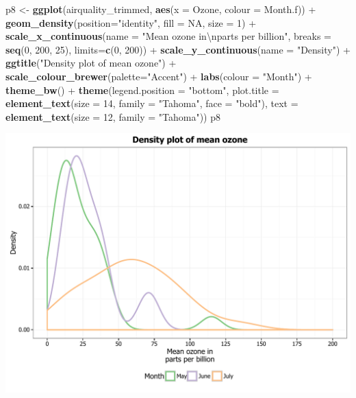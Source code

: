 \documentclass[]{article}
\newenvironment{Shaded}{\begin{snugshade}}{\end{snugshade}}
\newcommand{\KeywordTok}[1]{\textcolor[rgb]{0.13,0.29,0.53}{\textbf{{#1}}}}
\newcommand{\DataTypeTok}[1]{\textcolor[rgb]{0.13,0.29,0.53}{{#1}}}
\newcommand{\DecValTok}[1]{\textcolor[rgb]{0.00,0.00,0.81}{{#1}}}
\newcommand{\CharTok}[1]{\textcolor[rgb]{0.31,0.60,0.02}{{#1}}}
\newcommand{\StringTok}[1]{\textcolor[rgb]{0.31,0.60,0.02}{{#1}}}
\newcommand{\OtherTok}[1]{\textcolor[rgb]{0.56,0.35,0.01}{{#1}}}
\newcommand{\NormalTok}[1]{{#1}}
\begin{document}
\begin{Shaded}
\begin{Highlighting}[]
\NormalTok{p8 <-}\StringTok{ }\KeywordTok{ggplot}\NormalTok{(airquality_trimmed, }\KeywordTok{aes}\NormalTok{(}\DataTypeTok{x =} \NormalTok{Ozone, }\DataTypeTok{colour =} \NormalTok{Month.f)) +}\StringTok{ }
\StringTok{      }\KeywordTok{geom_density}\NormalTok{(}\DataTypeTok{position=}\StringTok{"identity"}\NormalTok{, }\DataTypeTok{fill =} \OtherTok{NA}\NormalTok{, }\DataTypeTok{size =} \DecValTok{1}\NormalTok{) +}
\StringTok{      }\KeywordTok{scale_x_continuous}\NormalTok{(}\DataTypeTok{name =} \StringTok{"Mean ozone in}\CharTok{\textbackslash{}n}\StringTok{parts per billion"}\NormalTok{,}
                         \DataTypeTok{breaks =} \KeywordTok{seq}\NormalTok{(}\DecValTok{0}\NormalTok{, }\DecValTok{200}\NormalTok{, }\DecValTok{25}\NormalTok{),}
                         \DataTypeTok{limits=}\KeywordTok{c}\NormalTok{(}\DecValTok{0}\NormalTok{, }\DecValTok{200}\NormalTok{)) +}
\StringTok{      }\KeywordTok{scale_y_continuous}\NormalTok{(}\DataTypeTok{name =} \StringTok{"Density"}\NormalTok{) +}
\StringTok{      }\KeywordTok{ggtitle}\NormalTok{(}\StringTok{"Density plot of mean ozone"}\NormalTok{) +}
\StringTok{      }\KeywordTok{scale_colour_brewer}\NormalTok{(}\DataTypeTok{palette=}\StringTok{"Accent"}\NormalTok{) +}
\StringTok{      }\KeywordTok{labs}\NormalTok{(}\DataTypeTok{colour =} \StringTok{"Month"}\NormalTok{) +}
\StringTok{      }\KeywordTok{theme_bw}\NormalTok{() +}
\StringTok{      }\KeywordTok{theme}\NormalTok{(}\DataTypeTok{legend.position =} \StringTok{"bottom"}\NormalTok{,}
            \DataTypeTok{plot.title =} \KeywordTok{element_text}\NormalTok{(}\DataTypeTok{size =} \DecValTok{14}\NormalTok{, }\DataTypeTok{family =} \StringTok{"Tahoma"}\NormalTok{, }\DataTypeTok{face =} \StringTok{"bold"}\NormalTok{), }
            \DataTypeTok{text =} \KeywordTok{element_text}\NormalTok{(}\DataTypeTok{size =} \DecValTok{12}\NormalTok{, }\DataTypeTok{family =} \StringTok{"Tahoma"}\NormalTok{))}
\NormalTok{p8}
\end{Highlighting}
\end{Shaded}

\begin{center}\includegraphics{0_all_posts_pdf/density_19-1} \end{center}
\end{document}
